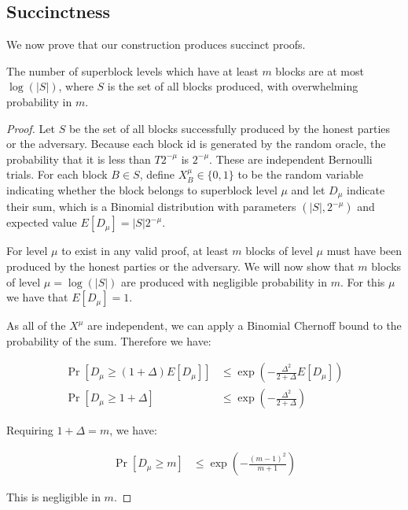 \subsection{Succinctness}

We now prove that our construction produces succinct proofs.

\begin{theorem}
    \label{thm.few-levels}
    The number of superblock levels which have at least $m$ blocks are at most
    $\log(|S|)$, where $S$ is the set of all blocks produced, with overwhelming
    probability in $m$.
\end{theorem}

\begin{proof}
    Let $S$ be the set of all blocks successfully produced by the honest
    parties or the adversary. Because each block id is generated by the random
    oracle, the probability that it is less than $T 2^{-\mu}$ is
    $2^{-\mu}$. These are independent Bernoulli trials. For each block
    $B \in S$, define $X^{\mu}_B \in \{0, 1\}$ to be the random variable
    indicating whether the block belongs to superblock level $\mu$ and let
    $D_\mu$ indicate their sum, which is a Binomial distribution with
    parameters $(|S|, 2^{-\mu})$ and expected value $E[D_{\mu}] =
    |S| 2^{-\mu}$.

    For level $\mu$ to exist in any valid proof, at least $m$ blocks of level
    $\mu$ must have been produced by the honest parties or the adversary. We
    will now show that $m$ blocks of level $\mu = \log(|S|)$ are produced with
    negligible probability in $m$. For this $\mu$ we have that $E[D_\mu] = 1$.

    As all of the $X^{\mu}$ are independent, we can apply a Binomial Chernoff
    bound to the probability of the sum. Therefore we have:

    \begin{align*}
        \Pr[D_\mu \geq (1 + \Delta)E[D_\mu]] &\leq \exp(-\frac{\Delta^2}{2 + \Delta}E[D_\mu]) \\
        \Pr[D_\mu \geq 1 + \Delta] &\leq \exp(-\frac{\Delta^2}{2 + \Delta})
    \end{align*}

    Requiring $1 + \Delta = m$, we have:

    \begin{align*}
        \Pr[D_\mu \geq m] &\leq \exp(-\frac{(m - 1)^2}{m + 1})
    \end{align*}

    This is negligible in $m$.
\end{proof}

